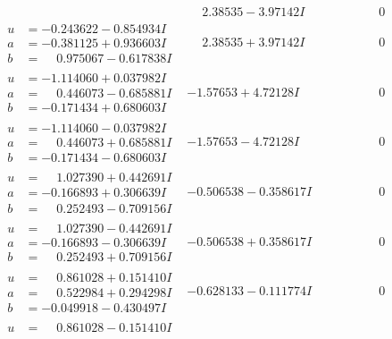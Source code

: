 \documentclass[1p]{elsarticle_modified}
\theoremstyle{definition}
\begin{document}
$$\begin{array}{c|c|c}
 & \phantom{-}2.38535 - 3.97142 I & \phantom{-0.000000 } 0 \\ \hline\begin{aligned}
u &= -0.243622 - 0.854934 I \\
a &= -0.381125 + 0.936603 I \\
b &= \phantom{-}0.975067 - 0.617838 I\end{aligned}
 & \phantom{-}2.38535 + 3.97142 I & \phantom{-0.000000 } 0 \\ \hline\begin{aligned}
u &= -1.114060 + 0.037982 I \\
a &= \phantom{-}0.446073 - 0.685881 I \\
b &= -0.171434 + 0.680603 I\end{aligned}
 & -1.57653 + 4.72128 I & \phantom{-0.000000 } 0 \\ \hline\begin{aligned}
u &= -1.114060 - 0.037982 I \\
a &= \phantom{-}0.446073 + 0.685881 I \\
b &= -0.171434 - 0.680603 I\end{aligned}
 & -1.57653 - 4.72128 I & \phantom{-0.000000 } 0 \\ \hline\begin{aligned}
u &= \phantom{-}1.027390 + 0.442691 I \\
a &= -0.166893 + 0.306639 I \\
b &= \phantom{-}0.252493 - 0.709156 I\end{aligned}
 & -0.506538 - 0.358617 I & \phantom{-0.000000 } 0 \\ \hline\begin{aligned}
u &= \phantom{-}1.027390 - 0.442691 I \\
a &= -0.166893 - 0.306639 I \\
b &= \phantom{-}0.252493 + 0.709156 I\end{aligned}
 & -0.506538 + 0.358617 I & \phantom{-0.000000 } 0 \\ \hline\begin{aligned}
u &= \phantom{-}0.861028 + 0.151410 I \\
a &= \phantom{-}0.522984 + 0.294298 I \\
b &= -0.049918 - 0.430497 I\end{aligned}
 & -0.628133 - 0.111774 I & \phantom{-0.000000 } 0 \\ \hline\begin{aligned}
u &= \phantom{-}0.861028 - 0.151410 I \\

\end{aligned}
\end{array}$$
\end{document}

